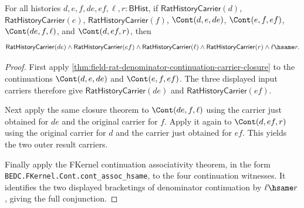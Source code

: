 \begin{theorem}
\label{thm:field-rat-denominator-continuation-semigroup-laws}
For all histories $d,e,f,de,ef,\ell,r:\mathsf{BHist}$, if
$\mathsf{RatHistoryCarrier}(d)$, $\mathsf{RatHistoryCarrier}(e)$,
$\mathsf{RatHistoryCarrier}(f)$, $\Cont(d,e,de)$, $\Cont(e,f,ef)$,
$\Cont(de,f,\ell)$, and $\Cont(d,ef,r)$, then
$$
\mathsf{RatHistoryCarrier}(de)\land
\mathsf{RatHistoryCarrier}(ef)\land
\mathsf{RatHistoryCarrier}(\ell)\land
\mathsf{RatHistoryCarrier}(r)\land
\ell\hsame r.
$$
\end{theorem}
\begin{proof}
First apply
\autoref{thm:field-rat-denominator-continuation-carrier-closure} to the
continuations $\Cont(d,e,de)$ and $\Cont(e,f,ef)$. The three displayed input
carriers therefore give $\mathsf{RatHistoryCarrier}(de)$ and
$\mathsf{RatHistoryCarrier}(ef)$.

Next apply the same closure theorem to $\Cont(de,f,\ell)$ using the carrier
just obtained for $de$ and the original carrier for $f$. Apply it again to
$\Cont(d,ef,r)$ using the original carrier for $d$ and the carrier just
obtained for $ef$. This yields the two outer result carriers.

Finally apply the FKernel continuation associativity theorem, in the form
\texttt{BEDC.FKernel.Cont.cont\_assoc\_hsame}, to the four continuation
witnesses. It identifies the two displayed bracketings of denominator
continuation by $\ell\hsame r$, giving the full conjunction.
\end{proof}

